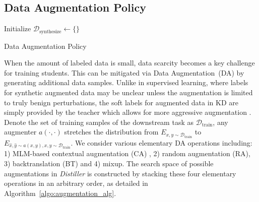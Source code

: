 \documentclass[11pt]{article}
\begin{document}
\subsection{Data Augmentation Policy}
\label{subsec:DA}
\begin{algorithm}[b!]
\scriptsize
  \BlankLine
  Initialize $\mathcal{D}_\text{synthesize} \leftarrow \{\}$ \\
  \caption{Data Augmentation Policy}
  \label{algo:augmentation_alg}
\end{algorithm}
When the amount of labeled data is small, data scarcity becomes a key challenge for training students.
This can be mitigated via Data Augmentation~(DA) by generating additional data samples. Unlike in supervised learning, where labels for synthetic augmented data may be unclear unless the augmentation is limited to truly benign perturbations, the soft labels for augmented data in KD are simply provided by the teacher which allows for more aggressive augmentation \citep{fakoor2020fast}. 
Denote the set of training samples of the downstream task as $\mathcal{D}_{\text{train}}$, any augmenter $a(\cdot, \cdot)$ stretches the distribution from $E_{x,y\sim {\mathcal{D}_{\text{train}}}}$ to $E_{\hat{x},\hat{y}\sim {a(x,y)},x,y\sim {\mathcal{D}_{\text{train}}}}$. We consider various elementary DA operations including: 1) MLM-based contextual augmentation (CA) , 2) random augmentation (RA), 3) backtranslation (BT) and 4) mixup. The search space of possible augmentations in \emph{Distiller} is constructed by stacking these four elementary operations in an arbitrary order, as detailed in Algorithm~\ref{algo:augmentation_alg}.
\end{document}
